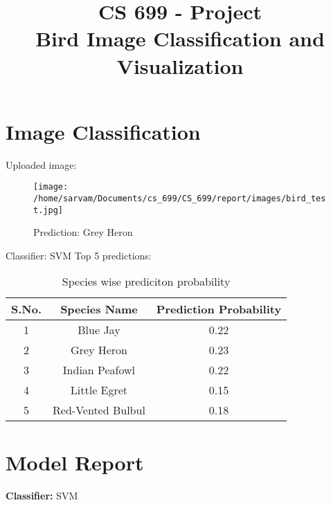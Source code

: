 \documentclass{article}
\date{}
\title{CS 699 - Project\\ Bird Image Classification and Visualization}
\begin{document}
\maketitle

\section{Image Classification}

\noindent Uploaded image:

\begin{figure}[h!]
\centering
\texttt{[image: /home/sarvam/Documents/cs\_699/CS\_699/report/images/bird\_test.jpg]}
\caption*{Prediction: Grey Heron}
\label{fig:method}
\end{figure}

\noindent Classifier: SVM
\newline
\newline
\newline
\noindent Top 5 predictions:
\newline
\begin{table}[h!]
\centering
\begin{tabular}{|c|c|c|} 
\hline
 S.No. & Species Name & Prediction Probability\\ 
\hline
 1 & Blue Jay & 0.22 \\ 
 \hline
 2 & Grey Heron & 0.23 \\  
 \hline
 3 & Indian Peafowl & 0.22 \\    
 \hline
 4 & Little Egret & 0.15 \\    
 \hline
 5 & Red-Vented Bulbul & 0.18 \\    
 \hline
\end{tabular}
\caption{Species wise prediciton probability}
\label{table:data}
\end{table}




\newpage
\section{Model Report}

\textbf{Classifier:} SVM
\newline
\end{document}
